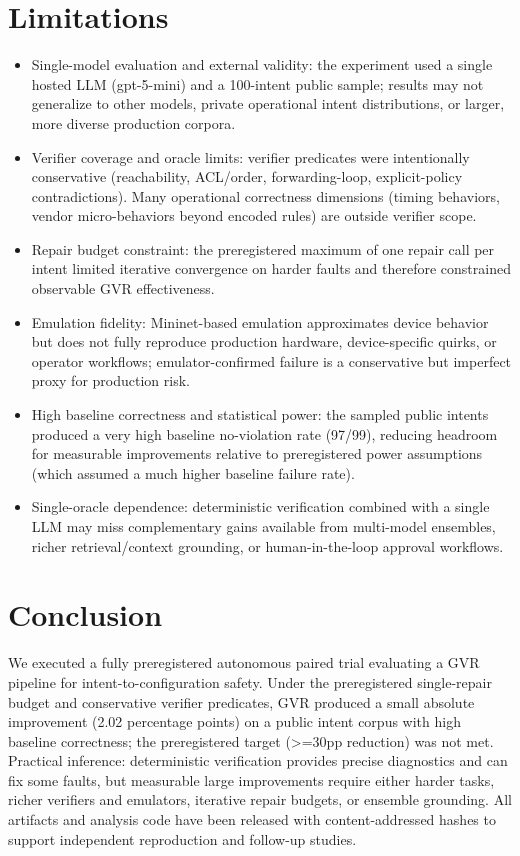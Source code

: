 \documentclass[conference]{IEEEtran}
\begin{document}
\section{Limitations}
\begin{itemize}
\item Single-model evaluation and external validity: the experiment used a single hosted LLM (gpt-5-mini) and a 100-intent public sample; results may not generalize to other models, private operational intent distributions, or larger, more diverse production corpora.
\item Verifier coverage and oracle limits: verifier predicates were intentionally conservative (reachability, ACL/order, forwarding-loop, explicit-policy contradictions). Many operational correctness dimensions (timing behaviors, vendor micro-behaviors beyond encoded rules) are outside verifier scope.
\item Repair budget constraint: the preregistered maximum of one repair call per intent limited iterative convergence on harder faults and therefore constrained observable GVR effectiveness.
\item Emulation fidelity: Mininet-based emulation approximates device behavior but does not fully reproduce production hardware, device-specific quirks, or operator workflows; emulator-confirmed failure is a conservative but imperfect proxy for production risk.
\item High baseline correctness and statistical power: the sampled public intents produced a very high baseline no-violation rate (97/99), reducing headroom for measurable improvements relative to preregistered power assumptions (which assumed a much higher baseline failure rate).
\item Single-oracle dependence: deterministic verification combined with a single LLM may miss complementary gains available from multi-model ensembles, richer retrieval/context grounding, or human-in-the-loop approval workflows.
\end{itemize}

\section{Conclusion}
We executed a fully preregistered autonomous paired trial evaluating a GVR pipeline for intent-to-configuration safety. Under the preregistered single-repair budget and conservative verifier predicates, GVR produced a small absolute improvement (2.02 percentage points) on a public intent corpus with high baseline correctness; the preregistered target (>=30pp reduction) was not met. Practical inference: deterministic verification provides precise diagnostics and can fix some faults, but measurable large improvements require either harder tasks, richer verifiers and emulators, iterative repair budgets, or ensemble grounding. All artifacts and analysis code have been released with content-addressed hashes to support independent reproduction and follow-up studies.
\end{document}
